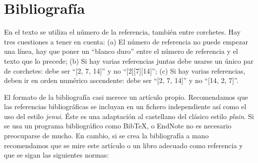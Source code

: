 \documentclass[twocolumn,twoside,a4paper, 10pt]{article}
\begin{document}
\section{Bibliografía}

En el texto se utiliza el número de la referencia, también entre 
corchetes. Hay tres cuestiones a tener en cuenta: (a) El número de 
referencia no puede empezar una línea, hay que poner un ``blanco 
duro'' entre el número de referencia y el texto que lo precede; (b) 
Si hay varias referencias juntas debe usarse un único par de 
corchetes: debe ser ``[2, 7, 14]'' y no ``[2][7][14]''; (c) Si hay 
varias referencias, deben ir en orden numérico ascendente: debe ser  
``[2, 7, 14]'' y no ``[14, 2, 7]''.

El formato de la bibliografía casi merece un artículo propio. 
Recomendamos que las referencias bibliográficas se incluyan en un fichero 
independiente así como el uso del estilo \textit{jenui}. Éste es una adaptación al castellano 
del clásico estilo \textit{plain}.
Si se usa un programa bibliográfico como BibTeX, o EndNote no es necesario 
preocuparse de mucho. En cambio, si se crea la bibliografía a mano 
recomendamos que se mire este artículo o un libro adecuado como 
referencia y que se sigan las siguientes normas:
%
\end{document}
